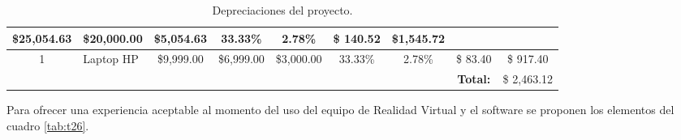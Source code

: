\begin{table}[H]
{\begin{tabular}{clccccc|c|c|}
  \multicolumn{1}{c|}{\$25,054.63} &
  \multicolumn{1}{c|}{\$20,000.00} &
  \multicolumn{1}{c|}{\$5,054.63} &
  \multicolumn{1}{c|}{33.33\%} &
  2.78\% &
  \$ 140.52 &
  \$1,545.72 \\ \hline
\multicolumn{1}{|c|}{\cellcolor[HTML]{C0C0C0}1} &
  \multicolumn{1}{l|}{Laptop HP} &
  \multicolumn{1}{c|}{\$9,999.00} &
  \multicolumn{1}{c|}{\$6,999.00} &
  \multicolumn{1}{c|}{\$3,000.00} &
  \multicolumn{1}{c|}{33.33\%} &
  2.78\% &
  \$ 83.40 &
  \$ 917.40 \\ \hline
\multicolumn{7}{l}{} &
  \textbf{Total:} &
  \$ 2,463.12 \\ \cline{8-9} 
\end{tabular}
}
\caption{Depreciaciones del proyecto.}
\label{tab:t25}
\end{table}

Para ofrecer una experiencia aceptable al momento del uso del equipo de Realidad Virtual y el software se proponen los elementos del cuadro \ref{tab:t26}.
